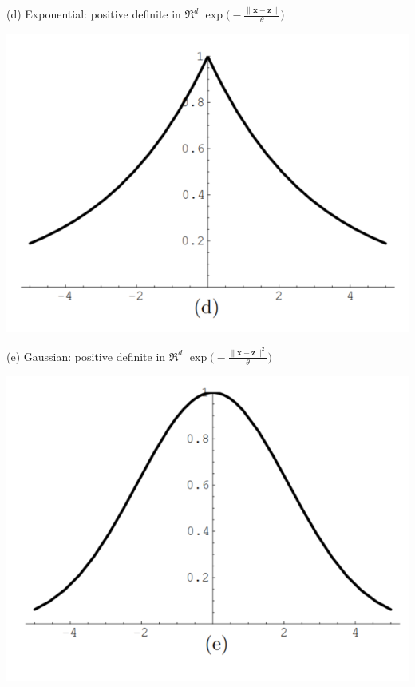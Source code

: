 \documentclass[
  ignorenonframetext,
]{beamer}
\begin{document}
\begin{frame}{}
\protect\hypertarget{section-6}{}
\begin{block}{(d) Exponential:}
\protect\hypertarget{d-exponential}{}
positive definite in \(\mathfrak R^d\)
\(\exp \Big(- \frac {\|\pmb x - \pmb z\|} \theta \Big)\)

\begin{center}\includegraphics[width=0.5\linewidth]{figure/marc_f2d} \end{center}
\end{block}
\end{frame}

\begin{frame}{}
\protect\hypertarget{section-7}{}
\begin{block}{(e) Gaussian:}
\protect\hypertarget{e-gaussian}{}
positive definite in \(\mathfrak R^d\)
\(\exp \Big(- \frac {\|\pmb x - \pmb z\|^2} \theta \Big)\)

\begin{center}\includegraphics[width=0.5\linewidth]{figure/marc_f2e} \end{center}
\end{block}
\end{frame}
\end{document}
